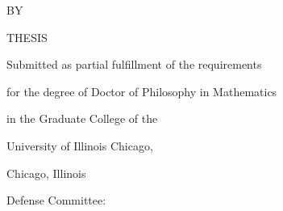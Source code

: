 \documentclass[12pt,reqno,oneside]{amsbook}
\theoremstyle{definition}
\theoremstyle{remark}
\begin{document}
\begin{titlepage}
    \centering

    {\Large\textbf{\thetitle}\par}

    \vspace{2cm}

    {BY\par}

    \vspace{0.5cm}

    {\theauthor\par}
    {\priordegrees\par}

    \vspace{2cm}

    THESIS

    \vspace{1cm}

    Submitted as partial fulfillment of the requirements\\
    \vspace{0.2cm}

    for the degree of Doctor of Philosophy in Mathematics\\
    \vspace{0.2cm}

    in the Graduate College of the\\
    \vspace{0.2cm}

    University of Illinois Chicago, \graduationyear\\

    \vspace{1cm}

    Chicago, Illinois

    \raggedright
    \vfill

    Defense Committee:\\
    \committee

\end{titlepage}

\setcounter{page}{2}



%
\end{document}
